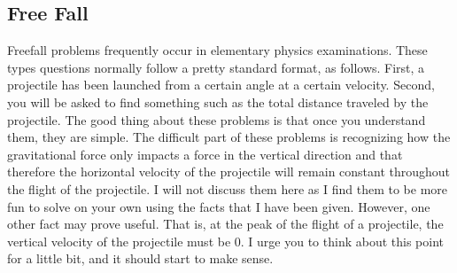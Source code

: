 \documentclass{article}[gray]
\numberwithin{equation}{subsection}
\begin{document}
\subsection{Free Fall}
Freefall problems frequently occur in elementary physics examinations. These types questions normally follow a pretty standard format, as follows. First, a projectile has been launched from a certain angle at a certain velocity. Second, you will be asked to find something such as the total distance traveled by the projectile. The good thing about these problems is that once you understand them, they are simple. The difficult part of these problems is recognizing how the gravitational force only impacts a force in the vertical direction and that therefore the horizontal velocity of the projectile will remain constant throughout the flight of the projectile. I will not discuss them here as I find them to be more fun to solve on your own using the facts that I have been given. However, one other fact may prove useful. That is, at the peak of the flight of a projectile, the vertical velocity of the projectile must be 0. I urge you to think about this point for a little bit, and it should start to make sense. 
\newline
\newline
\newline
\newline
{}
\newline
\newline
\newline
\newline
\end{document}
